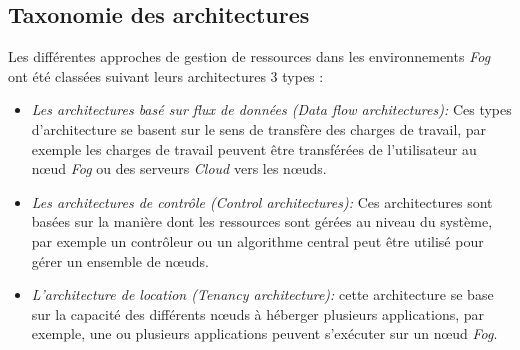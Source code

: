  \subsection{Taxonomie des architectures}
 Les différentes approches de gestion de ressources dans les environnements \emph{Fog} ont été classées suivant leurs architectures 3 types\cite{ch2019} :
 \begin{itemize}
   \item \emph{Les architectures basé sur flux de données (Data flow architectures):} Ces types d'architecture se basent sur le sens de transfère des charges de travail, par exemple les charges de travail peuvent être transférées de l'utilisateur au nœud \emph{Fog} ou des serveurs \emph{Cloud} vers les nœuds.
   \item \emph{Les architectures de contrôle (Control architectures):} Ces architectures sont basées sur la manière dont les ressources sont gérées au niveau du système, par exemple un contrôleur ou un algorithme central peut être utilisé pour gérer un ensemble de nœuds.
   \item \emph{L'architecture de location (Tenancy architecture):} cette architecture se base sur la capacité des différents nœuds à héberger plusieurs applications,  par exemple, une ou plusieurs applications peuvent s'exécuter sur un nœud \emph{Fog}.
 \end{itemize}

 
 
 
   
  



 

